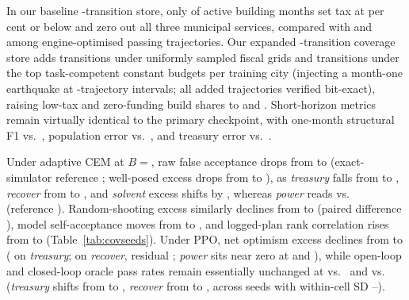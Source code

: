 In our baseline \TrainTransitions-transition store, only \CovTrainLowTax{} of active building months set tax at \CovLowTax{} per cent or below and \CovTrainZeroFund{} zero out all three municipal services, compared with \CovFrontLowTax{} and \CovFrontZeroFund{} among engine-optimised passing trajectories. Our expanded \CovUnionTransitions-transition coverage store adds \CovUniformTransitions{} transitions under uniformly sampled fiscal grids and \CovCompetentTransitions{} transitions under the top \CovBestK{} task-competent constant budgets per training city (injecting a month-one earthquake at \CovQuakeEvery{}-trajectory intervals; all \CovVerified{} added trajectories verified bit-exact), raising low-tax and zero-funding build shares to \CovUnionLowTax{} and \CovUnionZeroFund{}. Short-horizon metrics remain virtually identical to the primary checkpoint, with one-month structural F1 \CovTestFOne{} vs.\ \TestMainFOne{}, population error \CovTestPop{} vs.\ \TestMainPop{}, and treasury error \CovTestFunds{} vs.\ \TestMainFunds{}.

Under adaptive CEM at $B ={}$, raw false acceptance drops from \CovAdAllMainHack{} \ci{\CovAdAllMainHackCI} to \CovAdAllCovHack{} \ci{\CovAdAllCovHackCI} (exact-simulator reference \CovAdAllPerfHack{}; well-posed excess drops from \CovAdWPMainExcess{} \ci{\CovAdWPMainExcessCI} to \CovAdWPCovExcess{} \ci{\CovAdWPCovExcessCI}), as \emph{treasury} falls from \CovAdTreasMainHack{} to \CovAdTreasCovHack{}, \emph{recover} from \CovAdRecovMainHack{} to \CovAdRecovCovHack{}, and \emph{solvent} excess shifts by \CovAdSolvDiffExcess{}, whereas \emph{power} reads \CovAdPowerCovHack{} vs.\ \CovAdPowerMainHack{} (reference \CovAdPowerPerfHack{}). Random-shooting excess similarly declines from \CovRandAllMainExcess{} \ci{\CovRandAllMainExcessCI} to \CovRandAllCovExcess{} \ci{\CovRandAllCovExcessCI} (paired difference \CovRandAllDiffExcess{} \ci{\CovRandAllDiffExcessCI}), model self-acceptance moves from \CovAdAllMainJudgeAcc{} to \CovAdAllCovJudgeAcc{}, and logged-plan rank correlation rises from \CovDecFidMain{} to \CovDecFid{} (Table~\ref{tab:covseeds}). Under PPO, net optimism excess declines from \CovRlMainGapExcess{} \ci{\CovRlMainGapExcessCI} to \CovRlCovGapExcess{} \ci{\CovRlCovGapExcessCI} (\CovRlTreasGapDiff{} \ci{\CovRlTreasGapDiffCI} on \emph{treasury}; \CovRlRecovGapDiff{} \ci{\CovRlRecovGapDiffCI} on \emph{recover}, residual \CovRlRecovCovGapExcess{} \ci{\CovRlRecovCovGapExcessCI}; \emph{power} sits near zero at \CovRlPowerMainGap{} and \CovRlPowerCovGap{}), while open-loop and closed-loop oracle pass rates remain essentially unchanged at \CovRlCovOracleMean{} vs.\ \CovRlMainOracleMean{} and \CovRlCovClosedMean{} vs.\ \CovRlMainClosedMean{} (\emph{treasury} shifts from \CovRlTreasMainOracle{} to \CovRlTreasCovOracle{}, \emph{recover} from \CovRlRecovMainOracle{} to \CovRlRecovCovOracle{}, across \CovRlSeeds{} seeds with within-cell SD \CovRlAccSdMin{}--\CovRlAccSdMax{}).

